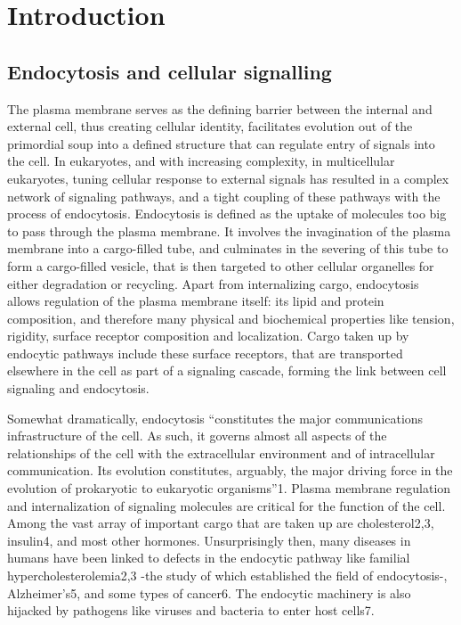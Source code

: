 \chapter{Introduction} %

\label{Ch:Aims} %

\section{Endocytosis and cellular signalling}
The plasma membrane serves as the defining barrier between the internal and external cell, thus creating cellular identity, facilitates evolution out of the primordial soup into a defined structure that can regulate entry of signals into the cell. In eukaryotes, and with increasing complexity, in multicellular eukaryotes, tuning cellular response to external signals has resulted in a complex network of signaling pathways, and a tight coupling of these pathways with the process of endocytosis. Endocytosis is defined as the uptake of molecules too big to pass through the plasma membrane. It involves the invagination of the plasma membrane into a cargo-filled tube, and culminates in the severing of this tube to form a cargo-filled vesicle, that is then targeted to other cellular organelles for either degradation or recycling. Apart from internalizing cargo, endocytosis allows regulation of the plasma membrane itself: its lipid and protein composition, and therefore many physical and biochemical properties like tension, rigidity, surface receptor composition and localization. Cargo taken up by endocytic pathways include these surface receptors, that are transported elsewhere in the cell as part of a signaling cascade, forming the link between cell signaling and endocytosis.

\vspace{5mm}
Somewhat dramatically, endocytosis “constitutes the major communications infrastructure of the cell. As such, it governs almost all aspects of the relationships of the cell with the extracellular environment and of intracellular communication. Its evolution constitutes, arguably, the major driving force in the evolution of prokaryotic to eukaryotic organisms”1.  Plasma membrane regulation and internalization of signaling molecules are critical for the function of the cell. Among the vast array of important cargo that are taken up are cholesterol2,3, insulin4, and most other hormones. Unsurprisingly then, many diseases in humans have been linked to defects in the endocytic pathway like familial hypercholesterolemia2,3 -the study of which established the field of endocytosis-, Alzheimer’s5, and some types of cancer6. The endocytic machinery is also hijacked by pathogens like viruses and bacteria to enter host cells7. 

